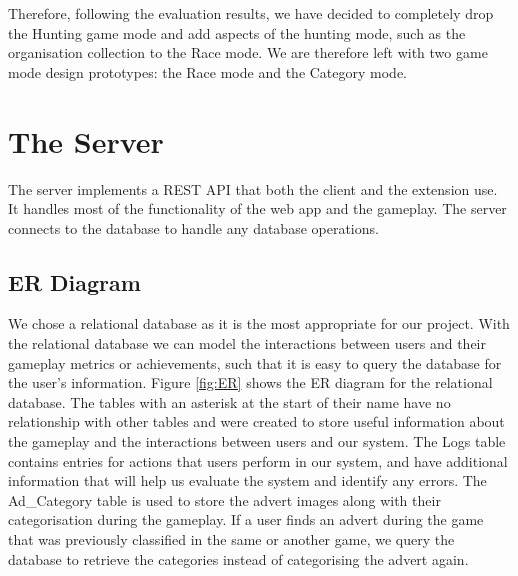 \documentclass{l4proj}
\begin{document}
Therefore, following the evaluation results, we have decided to completely drop the Hunting game mode and add aspects of the hunting mode, such as the organisation collection to the Race mode. We are therefore left with two game mode design prototypes: the Race mode and the Category mode.

\section{The Server}
The server implements a REST API that both the client and the extension use. It handles most of the functionality of the web app and the gameplay. The server connects to the database to handle any database operations. 

\subsection{ER Diagram}
We chose a relational database as it is the most appropriate for our project. With the relational database we can model the interactions between users and their gameplay metrics or achievements, such that it is easy to query the database for the user's information. Figure \ref{fig:ER} shows the ER diagram for the relational database. The tables with an asterisk at the start of their name have no relationship with other tables and were created to store useful information about the gameplay and the interactions between users and our system. The Logs table contains entries for actions that users perform in our system, and have additional information that will help us evaluate the system and identify any errors. The Ad\_Category table is used to store the advert images along with their categorisation during the gameplay. If a user finds an advert during the game that was previously classified in the same or another game, we query the database to retrieve the categories instead of categorising the advert again.
\end{document}

